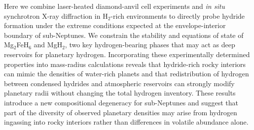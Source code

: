 \documentclass[draft,jgrga,12pt]{agujournal2019}
\begin{document}

Here we combine laser-heated diamond-anvil cell experiments and \textit{in situ} synchrotron X-ray diffraction in H$_2$-rich environments to directly probe hydride formation under the extreme conditions expected at the envelope-interior boundary of sub-Neptunes. We constrain the stability and equations of state of Mg$_2$FeH$_6$ and MgH$_2$, two key hydrogen-bearing phases that may act as deep reservoirs for planetary hydrogen. Incorporating these experimentally determined properties into mass-radius calculations reveals that hydride-rich rocky interiors can mimic the densities of water-rich planets and that redistribution of hydrogen between condensed hydrides and atmospheric reservoirs can strongly modify planetary radii without changing the total hydrogen inventory. These results introduce a new compositional degeneracy for sub-Neptunes and suggest that part of the diversity of observed planetary densities may arise from hydrogen ingassing into rocky interiors rather than differences in volatile abundance alone.





\end{document}
